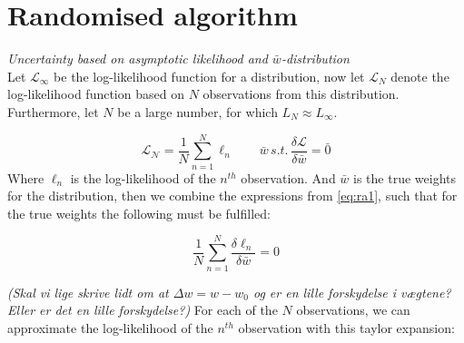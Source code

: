 \section{Randomised algorithm}
\emph{Uncertainty based on asymptotic likelihood and $\bar{w}$-distribution}\\
Let $\mathcal{L}_\infty$ be the log-likelihood function for a distribution, now let $\mathcal{L}_N$ denote the log-likelihood function based on $N$ observations from this distribution. Furthermore, let $N$ be a large number, for which $L_N \approx L_\infty$. 

\begin{equation}
\mathcal{L_N} = \frac{1}{N} \sum_{n=1}^N \ell_n \qquad \bar{w} \, s.t. \, \frac{\delta \mathcal{L}}{\delta \bar{w}} = \bar{0} \label{eq:ra1}
\end{equation}
Where $\ell_n$ is the log-likelihood of the $n^{th}$ observation. And $\bar{w}$ is the true weights for the distribution, then we combine the expressions from \eqref{eq:ra1}, such that for the true weights the following must be fulfilled:

\begin{equation}
\frac{1}{N} \sum_{n = 1}^N \frac{\delta \ell_n}{\delta \bar{w}} = 0 \label{eq:ra2}
\end{equation}

\emph{(Skal vi lige skrive lidt om at $\Delta w = w-w_0$ og er en lille forskydelse i vægtene? Eller er det en lille forskydelse?) }
For each of the $N$ observations, we can approximate the log-likelihood of the $n^{th}$ observation with this taylor expansion:

